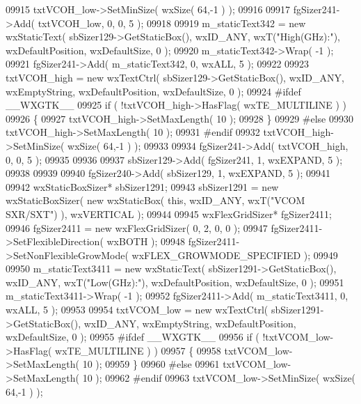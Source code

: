 \begin{DoxyCode}
09915     txtVCOH_low->SetMinSize( wxSize( 64,-1 ) );
09916     
09917     fgSizer241->Add( txtVCOH_low, 0, 0, 5 );
09918     
09919     m_staticText342 = \textcolor{keyword}{new} wxStaticText( sbSizer129->GetStaticBox(), wxID\_ANY, wxT(\textcolor{stringliteral}{"High(GHz):"}), 
      wxDefaultPosition, wxDefaultSize, 0 );
09920     m_staticText342->Wrap( -1 );
09921     fgSizer241->Add( m_staticText342, 0, wxALL, 5 );
09922     
09923     txtVCOH_high = \textcolor{keyword}{new} wxTextCtrl( sbSizer129->GetStaticBox(), wxID\_ANY, wxEmptyString, wxDefaultPosition, 
      wxDefaultSize, 0 );
09924 \textcolor{preprocessor}{    #ifdef \_\_WXGTK\_\_}
09925     \textcolor{keywordflow}{if} ( !txtVCOH_high->HasFlag( wxTE\_MULTILINE ) )
09926     \{
09927     txtVCOH_high->SetMaxLength( 10 );
09928     \}
09929 \textcolor{preprocessor}{    #else}
09930     txtVCOH_high->SetMaxLength( 10 );
09931 \textcolor{preprocessor}{    #endif}
09932     txtVCOH_high->SetMinSize( wxSize( 64,-1 ) );
09933     
09934     fgSizer241->Add( txtVCOH_high, 0, 0, 5 );
09935     
09936     
09937     sbSizer129->Add( fgSizer241, 1, wxEXPAND, 5 );
09938     
09939     
09940     fgSizer240->Add( sbSizer129, 1, wxEXPAND, 5 );
09941     
09942     wxStaticBoxSizer* sbSizer1291;
09943     sbSizer1291 = \textcolor{keyword}{new} wxStaticBoxSizer( \textcolor{keyword}{new} wxStaticBox( \textcolor{keyword}{this}, wxID\_ANY, wxT(\textcolor{stringliteral}{"VCOM SXR/SXT"}) ), wxVERTICAL 
      );
09944     
09945     wxFlexGridSizer* fgSizer2411;
09946     fgSizer2411 = \textcolor{keyword}{new} wxFlexGridSizer( 0, 2, 0, 0 );
09947     fgSizer2411->SetFlexibleDirection( wxBOTH );
09948     fgSizer2411->SetNonFlexibleGrowMode( wxFLEX\_GROWMODE\_SPECIFIED );
09949     
09950     m_staticText3411 = \textcolor{keyword}{new} wxStaticText( sbSizer1291->GetStaticBox(), wxID\_ANY, wxT(\textcolor{stringliteral}{"Low(GHz):"}), 
      wxDefaultPosition, wxDefaultSize, 0 );
09951     m_staticText3411->Wrap( -1 );
09952     fgSizer2411->Add( m_staticText3411, 0, wxALL, 5 );
09953     
09954     txtVCOM_low = \textcolor{keyword}{new} wxTextCtrl( sbSizer1291->GetStaticBox(), wxID\_ANY, wxEmptyString, wxDefaultPosition, 
      wxDefaultSize, 0 );
09955 \textcolor{preprocessor}{    #ifdef \_\_WXGTK\_\_}
09956     \textcolor{keywordflow}{if} ( !txtVCOM_low->HasFlag( wxTE\_MULTILINE ) )
09957     \{
09958     txtVCOM_low->SetMaxLength( 10 );
09959     \}
09960 \textcolor{preprocessor}{    #else}
09961     txtVCOM_low->SetMaxLength( 10 );
09962 \textcolor{preprocessor}{    #endif}
09963     txtVCOM_low->SetMinSize( wxSize( 64,-1 ) );

\end{DoxyCode}
